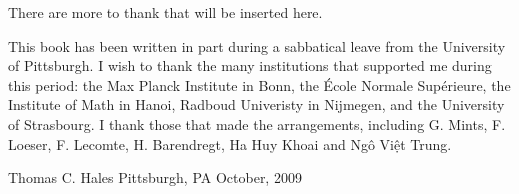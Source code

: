 \begin{note}%
There are more to thank that will be inserted here.
\end{note}

This book has been written in part during a sabbatical leave from the University of Pittsburgh.  I wish to thank the many institutions that supported
me during this period: the Max Planck Institute in Bonn, the \'Ecole Normale Sup\'erieure,  the Institute of Math
in Hanoi, Radboud Univeristy in Nijmegen, and the University of Strasbourg.
I thank those that made the arrangements, including G. Mints, F. Loeser, F. Lecomte, H. Barendregt, Ha Huy Khoai and Ng\^o Vi\d{\^e}t Trung.


\bigskip
\hbox{}



\bigskip
\hbox{}

{
\parindent=0pt
\obeylines

Thomas C. Hales
Pittsburgh, PA
October, 2009

}







